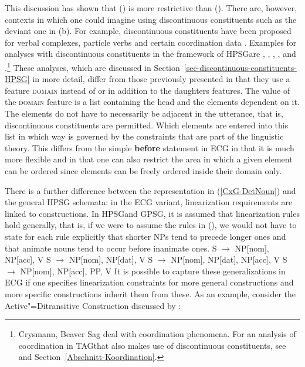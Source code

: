 This discussion has shown that () is more restrictive than (). There are, however, contexts in which one could imagine using
discontinuous constituents such as the deviant one in (b). For example, discontinuous constituents have been
proposed for verbal complexes, particle verbs and certain coordination data \citep{Wells47a}. 
Examples for analyses with discontinuous constituents in the framework of HPSG\indexhpsg are
, , , , and .\footnote{%
	Crysmann, Beaver \biband Sag deal with coordination phenomena. For an analysis of coordination in TAG\indextag that also makes use of
	discontinuous constituents, see    and Section~\ref{Abschnitt-Koordination}.%
} These analyses, which are discussed in Section~\ref{sec-discontinuous-constituents-HPSG} in more
detail, differ from those previously presented in that they use a feature
\textsc{domain} instead of or in addition to the daughters features. The value of the
\textsc{domain} feature is a list containing the head and the elements dependent on it.
The elements do not have to necessarily be adjacent in the utterance, that is, discontinuous constituents are permitted.
Which elements are entered into this list in which way is governed by the constraints that are part of the linguistic theory.
This differs from the simple \textbf{before} statement in ECG in that it is much more flexible and
in that one can also restrict the area in which a given element can be ordered
since elements can be freely ordered inside their domain only.

There is a further difference between the representation in (\ref{CxG-DetNoun}) and the general HPSG
schemata: in the ECG variant, linearization
requirements are linked to constructions. In HPSG\indexhpsg and GPSG\indexgpsg, it is assumed that linearization rules
hold generally, that is, if we were to assume the rules in (), we would not have to state for each rule explicitly that shorter NPs tend to precede
longer ones and that animate nouns tend to occur before inanimate ones.
\eal
\ex S $\to$ NP[nom], NP[acc], V
\ex S $\to$ NP[nom], NP[dat], V
\ex S $\to$ NP[nom], NP[dat], NP[acc], V
\ex S $\to$ NP[nom], NP[acc], PP, V
\zl
\largerpage
It is possible to capture these generalizations in ECG if one specifies linearization constraints for more general constructions and more specific constructions
inherit them from these. As an example, consider the Active"=Ditransitive Construction discussed by
\citet[]{BC2005a}:

